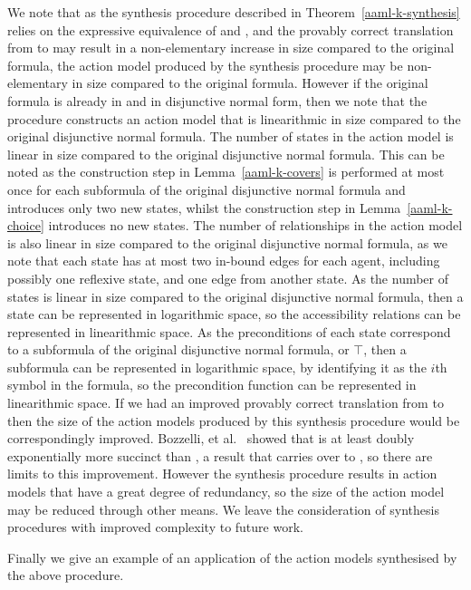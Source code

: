 We note that as the synthesis procedure described in Theorem~\ref{aaml-k-synthesis} relies on the expressive equivalence of \logicRamlK{} and \logicK{}, and the provably correct translation from \langAaml{} to \langMl{} may result in a non-elementary increase in size compared to the original formula, the action model produced by the synthesis procedure may be non-elementary in size compared to the original formula.
However if the original formula is already in \langMl{} and in disjunctive normal form, then we note that the procedure constructs an action model that is linearithmic in size compared to the original disjunctive normal formula.
The number of states in the action model is linear in size compared to the original disjunctive normal formula.
This can be noted as the construction step in Lemma~\ref{aaml-k-covers} is performed at most once for each subformula of the original disjunctive normal formula and introduces only two new states, whilst the construction step in Lemma~\ref{aaml-k-choice} introduces no new states.
The number of relationships in the action model is also linear in size compared to the original disjunctive normal formula, as we note that each state has at most two in-bound edges for each agent, including possibly one reflexive state, and one edge from another state.
As the number of states is linear in size compared to the original disjunctive normal formula, then a state can be represented in logarithmic space, so the accessibility relations can be represented in linearithmic space.
As the preconditions of each state correspond to a subformula of the original disjunctive normal formula, or $\top$, then a subformula can be represented in logarithmic space, by identifying it as the $i$th symbol in the formula, so the precondition function can be represented in linearithmic space.
If we had an improved provably correct translation from \langAaml{} to \langMl{} then the size of the action models produced by this synthesis procedure would be correspondingly improved.
Bozzelli, et al.~\cite{bozzelli:2014a} showed that \logicRmlK{} is at least doubly exponentially more succinct than \logicK{}, a result that carries over to \logicAamlK{}, so there are limits to this improvement.
However the synthesis procedure results in action models that have a great degree of redundancy, so the size of the action model may be reduced through other means.
We leave the consideration of synthesis procedures with improved complexity to future work.

Finally we give an example of an application of the action models synthesised by the above procedure.

